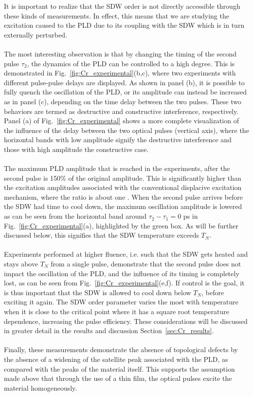 It is important to realize that the SDW order is not directly accessible through these kinds of measurements. In effect, this means that we are studying the excitation caused to the PLD due to its coupling with the SDW which is in turn externally perturbed.
\\\\
The most interesting observation is that by changing the timing of the second pulse $\tau_2$, the dynamics of the PLD can be controlled to a high degree.
This is demonstrated in Fig.~\ref{fig:Cr_experimental}(b,c), where two experiments with different pulse-pulse delays are displayed.
As shown in panel (b), it is possible to fully quench the oscillation of the PLD, or its amplitude can instead be increased as in panel (c), depending on the time delay between the two pulses.
These two behaviors are termed as destructive and constructive interference, respectively.
Panel (a) of Fig.~\ref{fig:Cr_experimental} shows a more complete visualization of the influence of the delay between the two optical pulses (vertical axis), where the horizontal bands with low amplitude signify the destructive interference and those with high amplitude the constructive case.
\\\\
The maximum PLD amplitude that is reached in the experiments, after the second pulse is 150\% of the original amplitude.
This is significantly higher than the excitation amplitudes associated with the conventional displacive excitation mechanism, where the ratio is about one \cite{Singer2015prl,Zeiger1992}. 
When the second pulse arrives before the SDW had time to cool down, the maximum oscillation amplitude is lowered as can be seen from the horizontal band around $\tau_2 - \tau_1 = 0$ ps in Fig.~\ref{fig:Cr_experimental}(a), highlighted by the green box.
As will be further discussed below, this signifies that the SDW temperature exceeds $T_N$.
\\\\
Experiments performed at higher fluence, i.e. such that the SDW gets heated and stays above $T_N$ from a single pulse, demonstrate that the second pulse does not impact the oscillation of the PLD, and the influence of its timing is completely lost, as can be seen from Fig.~\ref{fig:Cr_experimental}(e,f).
If control is the goal, it is thus important that the SDW is allowed to cool down below $T_N$, before exciting it again.
The SDW order parameter varies the most with temperature when it is close to the critical point where it has a square root temperature dependence, increasing the pulse efficiency.
These considerations will be discussed in greater detail in the results and discussion Section~\ref{sec:Cr_results}.
\\\\
Finally, these measurements demonstrate the absence of topological defects by the absence of a widening of the satellite peak associated with the PLD, as compared with the peaks of the material itself.
This supports the assumption made above that through the use of a thin film, the optical pulses excite the material homogeneously. 
